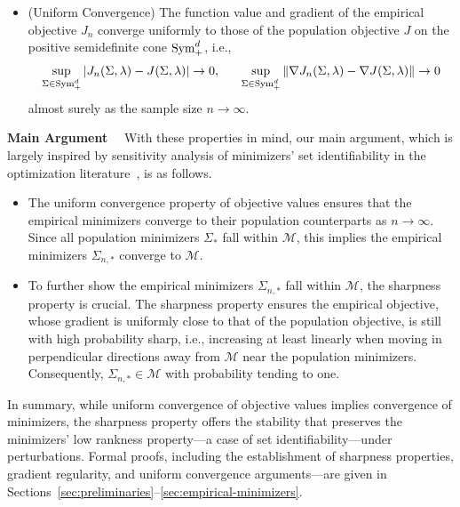 \documentclass[sn-mathphys-num]{sn-jnl}%
\numberwithin{equation}{section}
\newcommand{\norm}[1]{\left\|{#1}\right\|} %
\newcommand{\grad}{\nabla}
\newcommand{\Sym}{{\rm \mathrm{Sym}}}
\theoremstyle{thmstyleone}%
\theoremstyle{thmstyletwo}%
\theoremstyle{thmstylethree}%
\begin{document}
\begin{itemize}
\vspace{.5em} 
\item (Uniform Convergence) 
	The function value and gradient of the empirical objective $J_n$ converge uniformly 
	to those of the population objective $J$ on the positive semidefinite cone 
	$\Sym_+^d$, i.e., 
	\begin{equation}
	\begin{split} 
		\sup_{\Sigma \in \Sym_+^d} |J_n(\Sigma, \lambda) - J(\Sigma, \lambda)| \to 0,~~~~~
		\sup_{\Sigma \in \Sym_+^d} \norm{\grad J_n(\Sigma, \lambda) - \grad J(\Sigma, \lambda)} \to 0
	\end{split} 
	\end{equation} 
	almost surely as the sample size $n \to \infty$. 
\end{itemize}

\vspace{.3cm}
\noindent\noindent
\textbf{Main Argument}~~
With these properties in mind, our main argument, which is largely inspired by
sensitivity analysis of minimizers' set identifiability in the optimization 
literature~\cite{DrusvyatskiyLe14}, is as follows. \vspace{.3cm}
\begin{itemize}
\item The uniform convergence property of objective values ensures that the empirical 
	minimizers converge to their population counterparts as $n \to \infty$.
	Since all population minimizers $\Sigma_*$ fall within $\mathcal{M}$, this implies the 
	empirical minimizers $\Sigma_{n, *}$ converge to $\mathcal{M}$.
	
	\vspace{.3cm}
\item To further show the empirical minimizers $\Sigma_{n, *}$ fall within $\mathcal{M}$, 
	the sharpness property is crucial. The sharpness property ensures the empirical 
	objective, whose gradient is uniformly close to that of the population objective, 
	is still with high probability sharp, i.e., increasing at least linearly when moving in perpendicular directions away 
	from $\mathcal{M}$ near the population minimizers. Consequently, $\Sigma_{n,*} \in \mathcal{M}$ 
	with probability tending to one.
\end{itemize}
\vspace{.3cm}

In summary, while uniform convergence of objective values implies convergence 
of minimizers, the sharpness property offers the stability that preserves the minimizers' 
low rankness property---a case of set identifiability---under perturbations. 
Formal proofs, including the establishment of sharpness properties, gradient regularity, and 
uniform convergence arguments---are given in Sections~\ref{sec:preliminaries}--\ref{sec:empirical-minimizers}.
\end{document}

